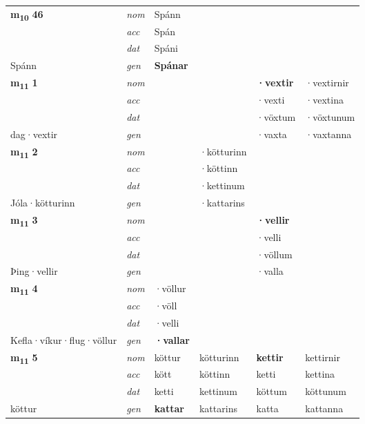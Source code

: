 \begin{longtable}[l]{X>{\footnotesize\itshape}XXXXX}
\multirow{3}{*}{{{\textbf{m{\textsubscript{10}}} \Large{\textbf{46}}}}} & nom & Spánn &  & \textbf{} &  \\*
 & acc & Spán &  &  &  \\*
 & dat & Spáni &  &  &  \\*
 {\footnotesize{Spánn}} & gen & \textbf{Spánar} &  &  &  \\
\cmidrule{1-6}

\multirow{3}{*}{{{\textbf{m{\textsubscript{11}}} \Large{\textbf{1}}}}} & nom &  &  & \textbf{·vextir} & ·vextirnir \\*
 & acc &  &  & ·vexti & ·vextina \\*
 & dat &  &  & ·vöxtum & ·vöxtunum \\*
 {\footnotesize{dag\allowbreak ·vextir}} & gen & \textbf{} &  & ·vaxta & ·vaxtanna \\
\cmidrule{1-6}

\multirow{3}{*}{{{\textbf{m{\textsubscript{11}}} \Large{\textbf{2}}}}} & nom &  & ·kötturinn & \textbf{} &  \\*
 & acc &  & ·köttinn &  &  \\*
 & dat &  & ·kettinum &  &  \\*
 {\footnotesize{Jóla\allowbreak ·kötturinn}} & gen & \textbf{} & ·kattarins &  &  \\
\cmidrule{1-6}

\multirow{3}{*}{{{\textbf{m{\textsubscript{11}}} \Large{\textbf{3}}}}} & nom &  &  & \textbf{·vellir} &  \\*
 & acc &  &  & ·velli &  \\*
 & dat &  &  & ·völlum &  \\*
 {\footnotesize{Þing\allowbreak ·vellir}} & gen & \textbf{} &  & ·valla &  \\
\cmidrule{1-6}

\multirow{3}{*}{{{\textbf{m{\textsubscript{11}}} \Large{\textbf{4}}}}} & nom & ·völlur &  & \textbf{} &  \\*
 & acc & ·völl &  &  &  \\*
 & dat & ·velli &  &  &  \\*
 {\footnotesize{Kefla\allowbreak ·víkur\allowbreak ·flug\allowbreak ·völlur}} & gen & \textbf{·vallar} &  &  &  \\
\cmidrule{1-6}

\multirow{3}{*}{{{\textbf{m{\textsubscript{11}}} \Large{\textbf{5}}}}} & nom & köttur & kötturinn & \textbf{kettir} & kettirnir \\*
 & acc & kött & köttinn & ketti & kettina \\*
 & dat & ketti & kettinum & köttum & köttunum \\*
 {\footnotesize{köttur}} & gen & \textbf{kattar} & kattarins & katta & kattanna \\
\cmidrule{1-6}


\end{longtable}
